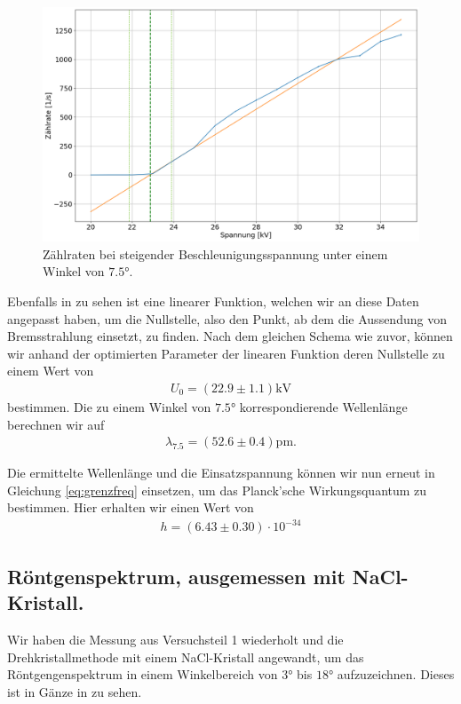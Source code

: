 \begin{figure}[H]
  \centering
  \includegraphics[width=.9\textwidth]{files/plots/lif_ang75_volt_fit.png}
  \caption{Zählraten bei steigender Beschleunigungsspannung unter einem Winkel von $7.5\si{\degree}$.}
  \label{fig:lif_ang75_volt_fit}
\end{figure}

Ebenfalls in  zu sehen ist eine linearer Funktion, welchen wir an diese Daten angepasst haben, um die Nullstelle, also den Punkt, ab dem die Aussendung von Bremsstrahlung einsetzt, zu finden. Nach dem gleichen Schema wie zuvor, können wir anhand der optimierten Parameter der linearen Funktion deren Nullstelle zu einem Wert von
\begin{align}
  U_0 = (22.9 \pm 1.1)\si{\kilo\volt}
\end{align}
bestimmen. Die zu einem Winkel von $7.5\si{\degree}$ korrespondierende Wellenlänge berechnen wir auf
\begin{align}
  \lambda_{7.5} = (52.6 \pm 0.4)\si{\pico\meter}.
\end{align}

Die ermittelte Wellenlänge und die Einsatzspannung können wir nun erneut in Gleichung \eqref{eq:grenzfreq} einsetzen, um das Planck'sche Wirkungsquantum zu bestimmen. Hier erhalten wir einen Wert von
\begin{align}
  h = (6.43 \pm 0.30) \cdot 10^{-34}
\end{align}

\subsection{Röntgenspektrum, ausgemessen mit NaCl-Kristall.}

Wir haben die Messung aus Versuchsteil 1 wiederholt und die Drehkristallmethode mit einem NaCl-Kristall angewandt, um das Röntgengenspektrum in einem Winkelbereich von $3\si{\degree}$ bis $18\si{\degree}$ aufzuzeichnen. Dieses ist in Gänze in  zu sehen.

